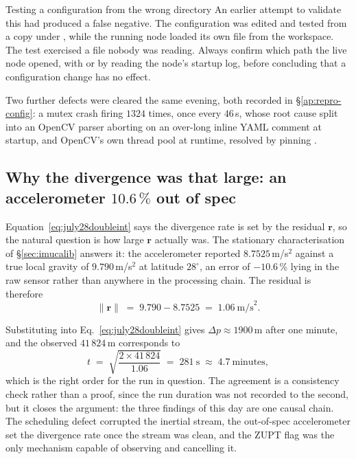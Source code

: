 \begin{trapbox}{Testing a configuration from the wrong directory}
An earlier attempt to validate this had produced a false negative. The
configuration was edited and tested from a copy under , while the
running node loaded its own file from the workspace. The test exercised a
file nobody was reading. Always confirm which path the live node opened, with
 or by reading the node's startup log, before concluding
that a configuration change has no effect.
\end{trapbox}

\noindent Two further defects were cleared the same evening, both recorded in
\S\ref{ap:repro-config}: a mutex crash firing $1324$ times, once every
$46$\,s, whose root cause split into an OpenCV  parser
aborting on an over-long inline YAML comment at startup, and OpenCV's own
thread pool at runtime, resolved by pinning
.

\subsection{Why the divergence was that large: an accelerometer $10.6\,\%$
out of spec}
\label{sec:july28accel}

Equation~\ref{eq:july28doubleint} says the divergence rate is set by the
residual $\mathbf{r}$, so the natural question is how large $\mathbf{r}$
actually was. The stationary characterisation of \S\ref{sec:imucalib}
answers it: the accelerometer reported $8.7525$\,m/s$^2$ against a true local
gravity of $9.790$\,m/s$^2$ at latitude $28^\circ$, an error of $-10.6\,\%$
lying in the raw sensor rather than anywhere in the processing chain. The
residual is therefore
\begin{equation}
\lVert \mathbf{r} \rVert \;=\; 9.790 - 8.7525 \;=\; 1.06\ \text{m/s}^2 .
\label{eq:july28residual}
\end{equation}

Substituting into Eq.~\ref{eq:july28doubleint} gives $\Delta p \approx
1900$\,m after one minute, and the observed $41\,824$\,m corresponds to
\begin{equation}
t \;=\; \sqrt{\frac{2 \times 41\,824}{1.06}} \;=\; 281\ \text{s}
  \;\approx\; 4.7\ \text{minutes},
\label{eq:july28consistency}
\end{equation}
which is the right order for the run in question. The agreement is a
consistency check rather than a proof, since the run duration was not
recorded to the second, but it closes the argument: the three findings of
this day are one causal chain. The scheduling defect corrupted the inertial
stream, the out-of-spec accelerometer set the divergence rate once the
stream was clean, and the ZUPT flag was the only mechanism capable of
observing and cancelling it.

